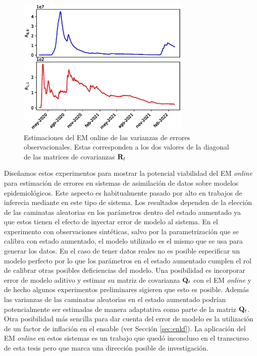 \begin{figure}[h]
    \centering
    \includegraphics[width=0.75\textwidth]{figs/seird_online_em_aug_state_R_arg_data.eps}
    \caption{Estimaciones del EM online de las varianzas de errores observacionales. Estas corresponden a los dos valores de la diagonal de las matrices de covarianzas $\mathbf{R}_t$}
    \label{fig:seird_R_arg_data}
\end{figure}

Diseñamos estos experimentos para mostrar la potencial viabilidad del EM \textit{online} para estimación de errores en sistemas de asimilación de datos sobre modelos epidemiológicos. Este aspecto es habitualmente pasado por alto en trabajos de inferecia mediante en este tipo de sistema. Los resultados dependen de la elección de las caminatas aleatorias en los parámetros dentro del estado aumentado ya que estos tienen el efecto de inyectar error de modelo al sistema. En el experimento con observaciones sintéticas, salvo por la parametrización que se calibra con estado aumentado, el modelo utilizado es el mismo que se usa para generar los datos. En el caso de tener datos reales no es posible especificar un modelo perfecto por lo que los parámetros en el estado aumentado cumplen el rol de calibrar otras posibles deficiencias del modelo. Una posibilidad es incorporar error de modelo aditivo y estimar su matriz de covarianza $\mathbf{Q}_t$ con el EM \textit{online} y de hecho algunos experimentos preliminares sigieren que esto es posible. Además las varianzas de las caminatas aleatorias en el estado aumentado podrían potencialmente ser estimadas de manera adaptativa como parte de la matriz $\mathbf{Q}_t$. Otra posibilidad más sencilla para dar cuenta del error de modelo es la utilización de un factor de inflación en el ensable (ver Sección \ref{sec:enkf}). La aplicación del EM \textit{online} en estos sistemas es un trabajo que quedó inconcluso en el transcurso de esta tesis pero que marca una dirección posible de investigación.
